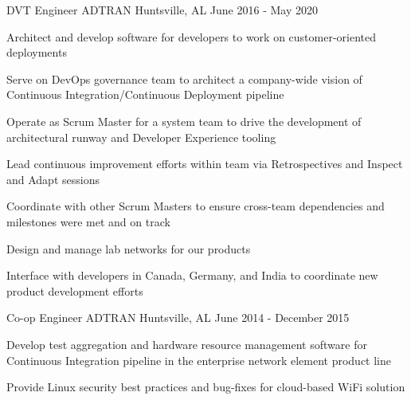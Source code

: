 
\begin{cventries}
  \cventry
    {DVT Engineer} %
    {ADTRAN} %
    {Huntsville, AL} %
    {June 2016 - May 2020} %
    {
      \begin{cvitems} %
        \item {Architect and develop software for developers to work on customer-oriented deployments}
        \item {Serve on DevOps governance team to architect a company-wide vision of Continuous Integration/Continuous Deployment pipeline}
        \item {Operate as Scrum Master for a system team to drive the development of architectural runway and Developer Experience tooling}
        \item {Lead continuous improvement efforts within team via Retrospectives and Inspect and Adapt sessions}
        \item {Coordinate with other Scrum Masters to ensure cross-team dependencies and milestones were met and on track}
        \item {Design and manage lab networks for our products}
        \item {Interface with developers in Canada, Germany, and India to coordinate new product development efforts}
      \end{cvitems}
    }

  \cventry
    {Co-op Engineer} %
    {ADTRAN} %
    {Huntsville, AL} %
    {June 2014 - December 2015} %
    {
      \begin{cvitems} %
        \item {Develop test aggregation and hardware resource management software for Continuous Integration pipeline in the enterprise network element product line}
        \item {Provide Linux security best practices and bug-fixes for cloud-based WiFi solution}
      \end{cvitems}
    }
\end{cventries}
